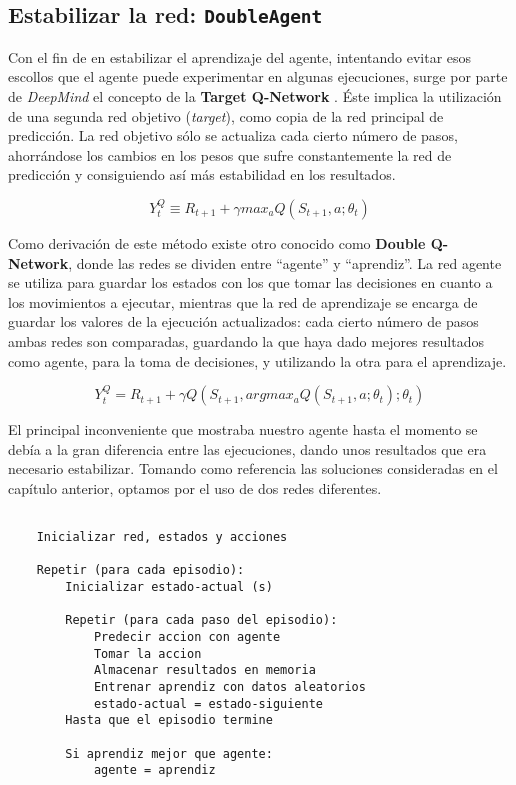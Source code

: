 \subsection{Estabilizar la red: \texttt{DoubleAgent}}
\label{sec:DA}

Con el fin de en estabilizar el aprendizaje del agente, intentando evitar esos escollos que el agente puede experimentar en algunas ejecuciones, surge por parte de \textit{DeepMind} el concepto de la \textbf{Target Q-Network} \citep{NIPS2010_3964}. Éste implica la utilización de una segunda red objetivo (\textit{target}), como copia de la red principal de predicción. La red objetivo sólo se actualiza cada cierto número de pasos, ahorrándose los cambios en los pesos que sufre constantemente la red de predicción y consiguiendo así más estabilidad en los resultados.

$$Y^Q_{t} \equiv R_{t+1} + \gamma max_{a} Q(S_{t+1}, a; \theta_{t})$$

Como derivación de este método existe otro conocido como \textbf{Double Q-Network}, donde las redes se dividen entre ``agente'' y ``aprendiz''. La red agente se utiliza para guardar los estados con los que tomar las decisiones en cuanto a los movimientos a ejecutar, mientras que la red de aprendizaje se encarga de guardar los valores de la ejecución actualizados: cada cierto número de pasos ambas redes son comparadas, guardando la que haya dado mejores resultados como agente, para la toma de decisiones, y utilizando la otra para el aprendizaje.

$$Y^Q_{t} = R_{t+1} + \gamma Q(S_{t+1}, argmax_{a} Q(S_{t+1}, a; \theta_{t}); \theta_{t})$$

El principal inconveniente que mostraba nuestro agente hasta el momento se debía a la gran diferencia entre las ejecuciones, dando unos resultados que era necesario estabilizar. Tomando como referencia las soluciones consideradas en el capítulo anterior, optamos por el uso de dos redes diferentes.

\begin{minipage}{0.9\linewidth}%
    \begin{lstlisting}[frame=tb, caption=Pseudocódigo DoubleAgent, inputencoding=latin1, label=code:cartpole_drl4]
    
    Inicializar red, estados y acciones
    
    Repetir (para cada episodio):
        Inicializar estado-actual (s)
        
        Repetir (para cada paso del episodio):
            Predecir accion con agente
            Tomar la accion
            Almacenar resultados en memoria
            Entrenar aprendiz con datos aleatorios
            estado-actual = estado-siguiente
        Hasta que el episodio termine

        Si aprendiz mejor que agente:
            agente = aprendiz
    \end{lstlisting}%
\end{minipage}

